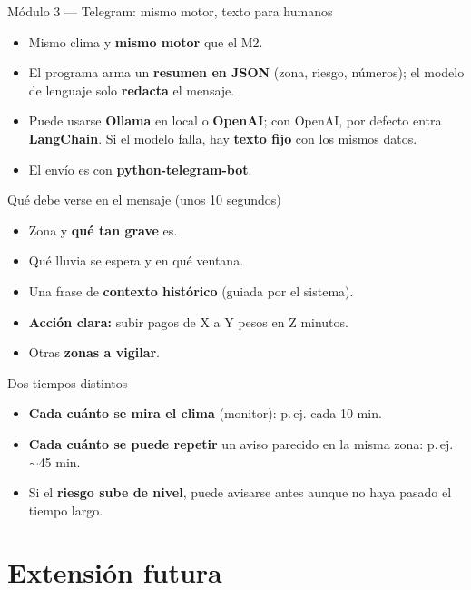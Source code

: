 \documentclass[aspectratio=169,spanish]{beamer}
\begin{document}
\begin{frame}{Módulo 3 — Telegram: mismo motor, texto para humanos}
  \begin{itemize}
    \item Mismo clima y \textbf{mismo motor} que el M2.
    \item El programa arma un \textbf{resumen en JSON} (zona, riesgo, números); el modelo de lenguaje solo \textbf{redacta} el mensaje.
    \item Puede usarse \textbf{Ollama} en local o \textbf{OpenAI}; con OpenAI, por defecto entra \textbf{LangChain}. Si el modelo falla, hay \textbf{texto fijo} con los mismos datos.
    \item El envío es con \textbf{python-telegram-bot}.
  \end{itemize}
\end{frame}

\begin{frame}{Qué debe verse en el mensaje (unos 10 segundos)}
  \begin{itemize}
    \item Zona y \textbf{qué tan grave} es.
    \item Qué lluvia se espera y en qué ventana.
    \item Una frase de \textbf{contexto histórico} (guiada por el sistema).
    \item \textbf{Acción clara:} subir pagos de X a Y pesos en Z minutos.
    \item Otras \textbf{zonas a vigilar}.
  \end{itemize}
\end{frame}


\begin{frame}{Dos tiempos distintos}
  \begin{itemize}
    \item \textbf{Cada cuánto se mira el clima} (monitor): p.\,ej. cada 10 min.
    \item \textbf{Cada cuánto se puede repetir} un aviso parecido en la misma zona: p.\,ej. $\sim$45 min.
    \item Si el \textbf{riesgo sube de nivel}, puede avisarse antes aunque no haya pasado el tiempo largo.
  \end{itemize}
\end{frame}


\section{Extensión futura}
\end{document}
